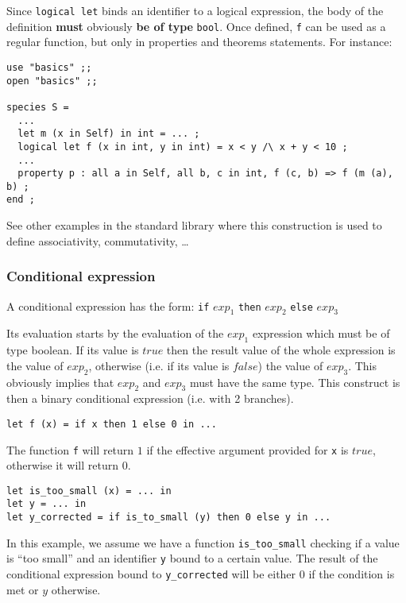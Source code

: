 Since {\tt logical let} binds an identifier to a logical expression, the
body of the definition {\bf must} obviously {\bf be of type}
{\tt bool}. Once defined, {\tt f} can be used as a regular function,
but only in
properties and theorems statements. For instance:
{\scriptsize
\begin{lstlisting}
use "basics" ;;
open "basics" ;;

species S =
  ...
  let m (x in Self) in int = ... ;
  logical let f (x in int, y in int) = x < y /\ x + y < 10 ;
  ...
  property p : all a in Self, all b, c in int, f (c, b) => f (m (a), b) ;
end ;
\end{lstlisting}
}
See other examples in the standard library where this construction is
used to define associativity, commutativity, \ldots




\subsubsection{Conditional expression}
\label{conditional-expression}
A conditional expression has the form:
{\tt if} $exp_1$ {\tt then}
$exp_2$ {\tt else} $exp_3$

Its evaluation starts by the evaluation of the $exp_1$ expression
which must be of type boolean. If its value is $true$ then the result
value of the whole expression is the value of $exp_2$, otherwise
(i.e. if its value is $false$) the value of $exp_3$. This obviously
implies that $exp_2$ and $exp_3$ must have the same type. This
construct is then a binary conditional expression (i.e. with 2
branches).  {\scriptsize
\begin{lstlisting}
let f (x) = if x then 1 else 0 in ...
\end{lstlisting}
}
The function {\tt f} will return $1$ if the effective argument
provided for {\tt x} is $true$, otherwise it will return $0$.
{\scriptsize
\begin{lstlisting}
let is_too_small (x) = ... in
let y = ... in
let y_corrected = if is_to_small (y) then 0 else y in ...
\end{lstlisting}
}
In this example, we assume we have a function {\tt is\_too\_small}
checking if a value is ``too small'' and an identifier {\tt y} bound
to a certain value. The result of the conditional expression bound to
{\tt y\_corrected} will be either $0$ if the condition is met or $y$
otherwise.



